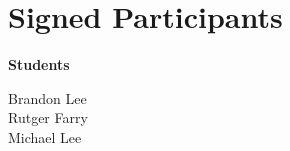 \documentclass[letterpaper,10pt,titlepage]{article}
\begin{document}
\newpage

\section{Signed Participants}

\textbf{Students}

Brandon Lee\\
Rutger Farry\\
Michael Lee\\
\end{document}
